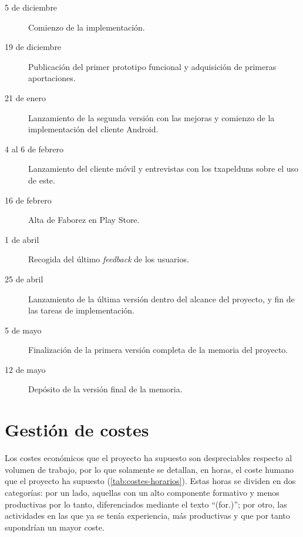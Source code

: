 \documentclass[main]{subfiles}
\begin{document}
\begin{description}
  \item[5 de diciembre] Comienzo de la implementación.
  \item[19 de diciembre] Publicación del primer prototipo funcional y adquisición de primeras aportaciones.
  \item[21 de enero] Lanzamiento de la segunda versión con las mejoras y comienzo de la implementación del cliente Android.
  \item[4 al 6 de febrero] Lanzamiento del cliente móvil y entrevistas con los \glspl{txapeldun} sobre el uso de este.
  \item[16 de febrero] Alta de Faborez en Play Store.
  \item[1 de abril] Recogida del último \emph{feedback} de los usuarios.
  \item[25 de abril] Lanzamiento de la última versión dentro del alcance del proyecto, y fin de las tareas de implementación.
  \item[5 de mayo] Finalización de la primera versión completa de la memoria del proyecto.
  \item[12 de mayo] Depósito de la versión final de la memoria.
\end{description}


\section{Gestión de costes}

Los costes económicos que el proyecto ha supuesto son despreciables respecto al volumen de trabajo, por lo que solamente se detallan, en horas, el coste humano que el proyecto ha supuesto (\cref{tab:costes-horarios}). Estas horas se dividen en dos categorías: por un lado, aquellas con un alto componente formativo y menos productivas por lo tanto, diferenciados mediante el texto \enquote{(for.)}; por otro, las actividades en las que ya se tenía experiencia, más productivas y que por tanto supondrían un mayor coste.
\end{document}
